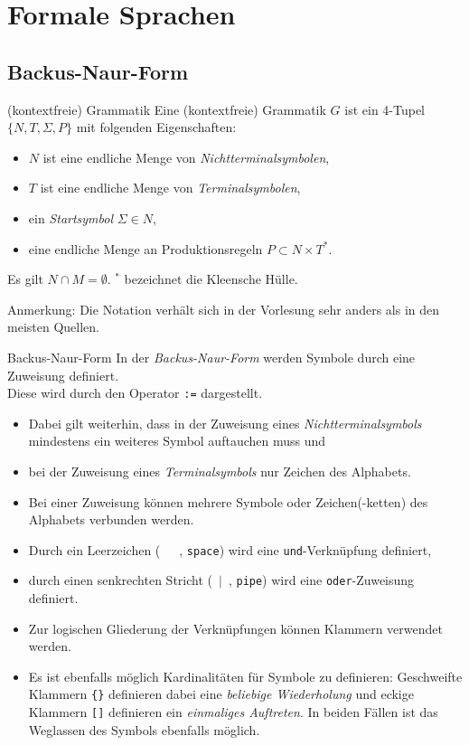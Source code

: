 \section{Formale Sprachen}
\subsection{Backus-Naur-Form}

\begin{defi}{(kontextfreie) Grammatik}
    Eine (kontextfreie) Grammatik $G$ ist ein 4-Tupel $\{N, T, \Sigma, P\}$ mit folgenden Eigenschaften:
    \begin{itemize}
        \item $N$ ist eine endliche Menge von \emph{Nichtterminalsymbolen},
        \item $T$ ist eine endliche Menge von \emph{Terminalsymbolen},
        \item ein \emph{Startsymbol} $\Sigma \in N$,
        \item eine endliche Menge an Produktionsregeln $P \subset N \times T^*$.
    \end{itemize}
    Es gilt $N \cap M = \emptyset$. $^*$ bezeichnet die Kleensche Hülle.

    Anmerkung: Die Notation verhält sich in der Vorlesung sehr anders als in den meisten Quellen.
\end{defi}

\begin{defi}{Backus-Naur-Form}
    In der \emph{Backus-Naur-Form} werden Symbole durch eine Zuweisung definiert.\\
    Diese wird durch den Operator \texttt{:=} dargestellt.

    \begin{itemize}
        \item Dabei gilt weiterhin, dass in der Zuweisung eines \emph{Nichtterminalsymbols} mindestens ein weiteres Symbol auftauchen muss und
        \item bei der Zuweisung eines \emph{Terminalsymbols} nur Zeichen des Alphabets.
        \item Bei einer Zuweisung können mehrere Symbole oder Zeichen(-ketten) des Alphabets verbunden werden.
        \item Durch ein Leerzeichen (\glqq ~~~\grqq, \texttt{space}) wird eine \texttt{und}-Verknüpfung definiert,
        \item durch einen senkrechten Stricht (\glqq ~$\mid$~\grqq, \texttt{pipe}) wird eine \texttt{oder}-Zuweisung definiert.
        \item Zur logischen Gliederung der Verknüpfungen können Klammern verwendet werden.
        \item Es ist ebenfalls möglich Kardinalitäten für Symbole zu definieren:
              \subitem Geschweifte Klammern \texttt{\{\}} definieren dabei eine \emph{beliebige Wiederholung} und
              \subitem eckige Klammern \texttt{[]} definieren ein \emph{einmaliges Auftreten}.
              \subitem In beiden Fällen ist das Weglassen des Symbols ebenfalls möglich.
    \end{itemize}
\end{defi}

